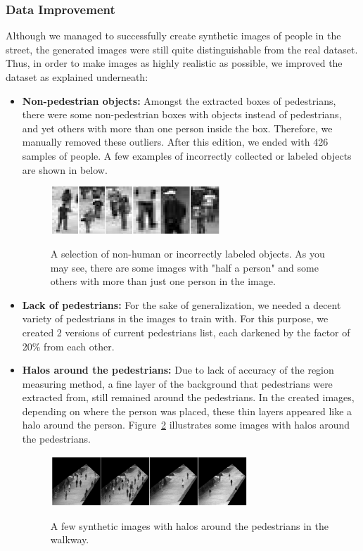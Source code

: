 \subsubsection{Data Improvement}
\label{dataimp}
Although we managed to successfully create synthetic images of people in the street, the generated images were still quite distinguishable from the real dataset. Thus, in order to make images as highly realistic as possible, we improved the dataset as explained underneath:
\begin{itemize}
\item \textbf{Non-pedestrian objects:} Amongst the extracted boxes of pedestrians, there were some non-pedestrian boxes with objects instead of pedestrians, and yet others with more than one person inside the box. Therefore, we manually removed these outliers. After this edition, we ended with 426 samples of people. A few examples of incorrectly collected or labeled objects are shown in below.

\begin{figure}[H]
	\centering
	{\includegraphics[width=0.6\textwidth]{images/nonped}}
	\caption{A selection of non-human or incorrectly labeled objects. As you may see, there are some images with "half a person" and some others with more than just one person in the image.}
	\label{fig:nonped}
\end{figure}
 
\item \textbf{Lack of pedestrians:} For the sake of generalization, we needed a decent variety of pedestrians in the images to train with. For this purpose, we created 2 versions of current pedestrians list, each darkened by the factor of 20\% from each other. 
\item \textbf{Halos around the pedestrians:} Due to lack of accuracy of the region measuring method, a fine layer of the background that pedestrians were extracted from, still remained around the pedestrians. In the created images, depending on where the person was placed, these thin layers appeared like a halo around the person. Figure~\ref{fig:haloim} illustrates some images with halos around the pedestrians. 
\begin{figure}[H]
	\centering
	{\includegraphics[width=0.7\textwidth]{images/halo}}
	\caption{A few synthetic images with halos around the pedestrians in the walkway.}
	\label{fig:haloim}
\end{figure}
 

\end{itemize}
